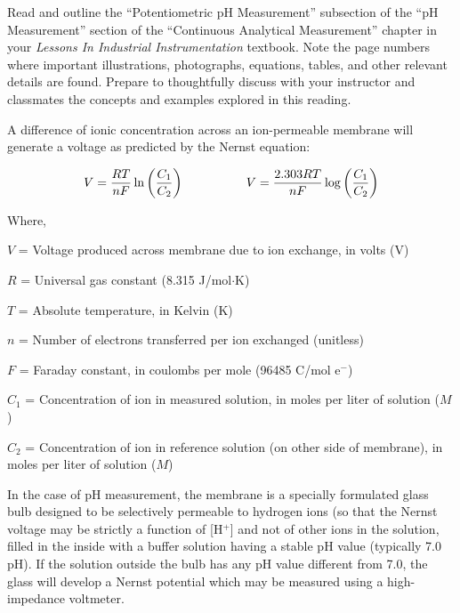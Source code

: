 
Read and outline the ``Potentiometric pH Measurement'' subsection of the ``pH Measurement'' section of the ``Continuous Analytical Measurement'' chapter in your {\it Lessons In Industrial Instrumentation} textbook.  Note the page numbers where important illustrations, photographs, equations, tables, and other relevant details are found.  Prepare to thoughtfully discuss with your instructor and classmates the concepts and examples explored in this reading.













A difference of ionic concentration across an ion-permeable membrane will generate a voltage as predicted by the Nernst equation:

$$V = {{R T} \over {nF}} \ln \left({C_1 \over C_2}\right) \hskip 50pt V = {{2.303 R T} \over {nF}} \log \left({C_1 \over C_2}\right)$$

\noindent
Where,

$V$ = Voltage produced across membrane due to ion exchange, in volts (V)

$R$ = Universal gas constant (8.315 J/mol$\cdot$K)

$T$ = Absolute temperature, in Kelvin (K)

$n$ = Number of electrons transferred per ion exchanged (unitless)

$F$ = Faraday constant, in coulombs per mole (96485 C/mol e$^{-}$)

$C_1$ = Concentration of ion in measured solution, in moles per liter of solution ($M$)

$C_2$ = Concentration of ion in reference solution (on other side of membrane), in moles per liter of solution ($M$)

\vskip 10pt

In the case of pH measurement, the membrane is a specially formulated glass bulb designed to be selectively permeable to hydrogen ions (so that the Nernst voltage may be strictly a function of [H$^{+}$] and not of other ions in the solution, filled in the inside with a buffer solution having a stable pH value (typically 7.0 pH).  If the solution outside the bulb has any pH value different from 7.0, the glass will develop a Nernst potential which may be measured using a high-impedance voltmeter.

